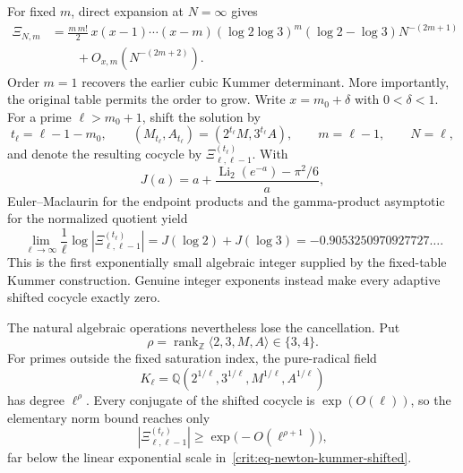 \documentclass[11pt,oneside]{article}
\theoremstyle{definition}
\theoremstyle{remark}
\newcommand{\Z}{\mathbb Z}
\newcommand{\Q}{\mathbb Q}
\begin{document}
For fixed $m$, direct expansion at $N=\infty$ gives
\begin{equation}
\begin{split}
 \Xi_{N,m}
 &=\frac{m\,m!}{2}\,x(x-1)\cdots(x-m)
   (\log2\log3)^m(\log2-\log3)N^{-(2m+1)}\\
 &\qquad+O_{x,m}(N^{-(2m+2)}).
\end{split}
 \label{crit:eq-newton-kummer-fixed}
\end{equation}
Order $m=1$ recovers the earlier cubic Kummer determinant.  More importantly, the original
table permits the order to grow.  Write $x=m_0+\delta$ with $0<\delta<1$.  For a prime
$\ell>m_0+1$, shift the solution by
\[
 t_\ell=\ell-1-m_0,\qquad
 (M_{t_\ell},A_{t_\ell})=(2^{t_\ell}M,3^{t_\ell}A),\qquad
 m=\ell-1,\qquad N=\ell,
\]
and denote the resulting cocycle by $\Xi^{(t_\ell)}_{\ell,\ell-1}$.  With
\[
 J(a)=a+\frac{\operatorname{Li}_2(e^{-a})-\pi^2/6}{a},
\]
Euler--Maclaurin for the endpoint products and the gamma-product asymptotic for the
normalized quotient yield
\begin{equation}
 \boxed{
 \lim_{\ell\to\infty}\frac1\ell
 \log\left|\Xi^{(t_\ell)}_{\ell,\ell-1}\right|
 =J(\log2)+J(\log3)
 =-0.9053250970927727\ldots .}
 \label{crit:eq-newton-kummer-shifted}
\end{equation}
This is the first exponentially small algebraic integer supplied by the fixed-table Kummer
construction.  Genuine integer exponents instead make every adaptive shifted cocycle exactly
zero.

The natural algebraic operations nevertheless lose the cancellation.  Put
\[
 \rho=\operatorname{rank}_{\Z}\langle2,3,M,A\rangle\in\{3,4\}.
\]
For primes outside the fixed saturation index, the pure-radical field
\[
 K_\ell=\Q(2^{1/\ell},3^{1/\ell},M^{1/\ell},A^{1/\ell})
\]
has degree $\ell^\rho$.  Every conjugate of the shifted cocycle is
$\exp(O(\ell))$, so the elementary norm bound reaches only
\begin{equation}
 \left|\Xi^{(t_\ell)}_{\ell,\ell-1}\right|
 \ge \exp\bigl(-O(\ell^{\rho+1})\bigr),
 \label{crit:eq-newton-kummer-norm-gap}
\end{equation}
far below the linear exponential scale in~\eqref{crit:eq-newton-kummer-shifted}.
\end{document}
